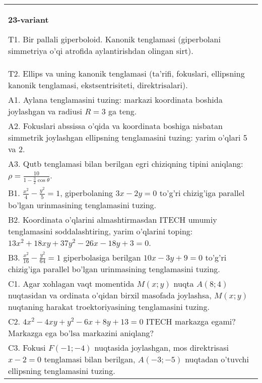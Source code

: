 \documentclass{article}
\begin{document}
\begin{tabular}{m{17cm}}
\textbf{23-variant}
\newline

T1. Bir pallali giperboloid. Kanonik tenglamasi (giperbolani simmetriya o'qi atrofida aylantirishdan olingan sirt).\\

T2. Ellips va uning kanonik tenglamasi (ta'rifi, fokuslari, ellipsning kanonik tenglamasi, ekstsentrisiteti, direktrisalari).\\

A1. Aylana tenglamasini tuzing: markazi koordinata boshida joylashgan va radiusi $R=3$ ga teng.\\

A2. Fokuslari abssissa o'qida va koordinata boshiga nisbatan simmetrik joylashgan ellipsning tenglamasini tuzing: yarim o'qlari 5 va 2.\\

A3. Qutb tenglamasi bilan berilgan egri chiziqning tipini aniqlang: $\rho=\frac{10}{1-\frac{3}{2}\cos\theta}$.\\

B1. $\frac{x^{2}}{4} - \frac{y^{2}}{5} = 1$, giperbolaning $3x - 2y = 0$ to'g'ri chizig'iga parallel bo'lgan urinmasining tenglamasini tuzing.  \\

B2. Koordinata o'qlarini almashtirmasdan ITECH umumiy tenglamasini soddalashtiring, yarim o'qlarini toping: $13x^{2} + 18xy + 37y^{2} - 26x - 18y + 3 = 0$.  \\

B3. $\frac{x^{2}}{16} - \frac{y^{2}}{64} = 1$ giperbolasiga berilgan $10x - 3y + 9 = 0$ to'g'ri chizig'iga parallel bo'lgan urinmasining tenglamasini tuzing.  \\

C1. Agar xohlagan vaqt momentida $M(x;y)$ nuqta $A(8;4)$ nuqtasidan va ordinata o'qidan birxil masofada joylashsa, $M(x;y)$ nuqtaning harakat troektoriyasining tenglamasini tuzing.  \\

C2. $4x^{2} - 4xy + y^{2} - 6x + 8y + 13 = 0$ ITECH markazga egami? Markazga ega bo'lsa markazini aniqlang?  \\

C3. Fokusi $F( - 1; - 4)$ nuqtasida joylashgan, mos direktrisasi $x - 2 = 0$ tenglamasi bilan berilgan, $A( - 3; - 5)$ nuqtadan o'tuvchi ellipsning tenglamasini tuzing.  \\

\end{tabular}
\vspace{1cm}
\end{document}
